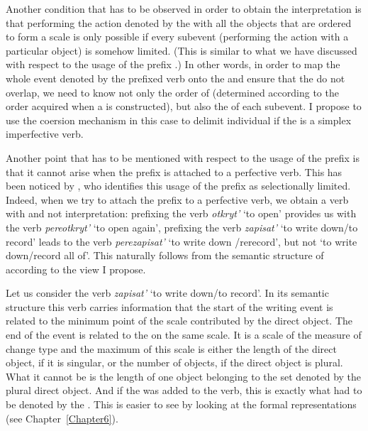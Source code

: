 Another condition that has to be observed in order to obtain the  interpretation is that performing the action denoted by the  with all the objects that are ordered to form a scale is only possible if every subevent (performing the action with a particular object) is somehow limited. (This is similar to what we have discussed with respect to the  usage of the prefix .) In other words, in order to map the whole event denoted by the  prefixed verb onto the  and ensure that the  do not overlap, we need to know not only the order of  (determined according to the order acquired when a  is constructed), but also the  of each subevent. I propose to use the coersion mechanism in this case to delimit individual  if the  is a simplex imperfective verb.

Another point that has to be mentioned with respect to the  usage of the prefix  is that it cannot arise when the prefix is attached to a perfective verb. This has been noticed by \citet{Tatevosov:09}, who identifies this usage of the prefix as selectionally limited. Indeed, when we try to attach the prefix  to a perfective verb, we obtain a verb with  and not  interpretation: prefixing the verb \textit{otkryt'} `to open' provides us with the verb \textit{pereotkryt'} `to open again', prefixing the verb \textit{zapisat'} `to write down/to record' leads to the verb \textit{perezapisat'} `to write down /rerecord', but not `to write down/record all of'. This naturally follows from the semantic structure of  according to the view I propose.

Let us consider the verb \textit{zapisat'} `to write down/to record'. In its semantic structure this verb carries information that the start of the writing event is related to the minimum point of the scale contributed by the direct object. The end of the event is related to the  on the same scale. It is a scale of the measure of change type and the maximum of this scale is either the length of the direct object, if it is singular, or the number of objects, if the direct object is plural. What it cannot be is the length of one object belonging to the set denoted by the plural direct object. And if the   was added to the verb, this is exactly what had to be denoted by the . This is easier to see by looking at the formal representations (see Chapter~\ref{Chapter6}).

